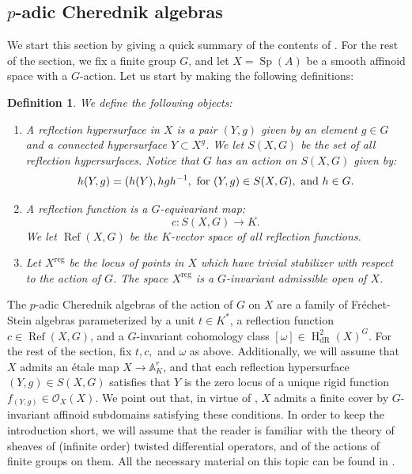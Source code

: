 \documentclass{amsart}
\newtheorem{defi}{ Definition}[subsection]
\newcommand{\Sp}{\operatorname{Sp}}
\newcommand{\OX}{\mathcal{O}}
\begin{document}
\subsection{\texorpdfstring{$p$-adic Cherednik algebras}{}}\label{section intro padicCHer}
We start this section by giving a quick summary of the contents of \cite{p-adicCheralg}. For the rest of the section, we fix a finite group $G$, and let $X=\Sp(A)$ be a smooth affinoid space with a $G$-action. Let us start by making the following definitions:
\begin{defi}
We define the following objects:
\begin{enumerate}[label=(\roman*)]
    \item A reflection hypersurface in $X$ is a pair $(Y,g)$ given by an element $g\in G$ and a connected  hypersurface $Y\subset X^g$. We let $S(X,G)$ be the set of all reflection hypersurfaces. Notice that $G$ has an action on $S(X,G)$ given by:
    \begin{equation*}
        h(Y,g)=(h(Y),hgh^{-1}, \textnormal{ for }(Y,g)\in S(X,G), \textnormal{ and }h\in G.
    \end{equation*}
    \item A reflection function is a $G$-equivariant map:
    \begin{equation*}
        c:S(X,G)\rightarrow K.
    \end{equation*}
    We let $\operatorname{Ref}(X,G)$ be the $K$-vector space of all reflection functions.
    \item Let $X^{\operatorname{reg}}$ be the locus of points in $X$ which have trivial stabilizer with respect to the action of $G$. The space $X^{\operatorname{reg}}$ is a $G$-invariant admissible open of $X$.
\end{enumerate}
\end{defi}
The $p$-adic Cherednik algebras of the action of $G$ on $X$ are a family of Fréchet-Stein algebras parameterized by a unit $t\in K^*$, a reflection function $c\in \operatorname{Ref}(X,G)$, and a $G$-invariant cohomology class $[\omega]\in \operatorname{H}_{\operatorname{dR}}^2(X)^G$.  For the rest of the section, fix $t,c,$ and $\omega$ as above. Additionally, we will assume that $X$ admits an étale map $X\rightarrow \mathbb{A}^r_K$, and that each reflection hypersurface $(Y,g)\in S(X,G)$ satisfies that $Y$ is the zero locus of a unique rigid function $f_{(Y,g)}\in \OX_X(X)$. We point out that, in virtue of \cite[Proposition 2.1.23]{p-adicCheralg}, $X$ admits a finite cover by $G$-invariant affinoid subdomains satisfying these conditions. In order to keep the introduction short, we will assume that the reader is familiar with the theory of sheaves of (infinite order) twisted differential operators, and of the actions of finite groups on them. All the necessary material on this topic can be found in \cite[Sections 2.3,2.4]{p-adicCheralg}.\bigskip
\end{document}
